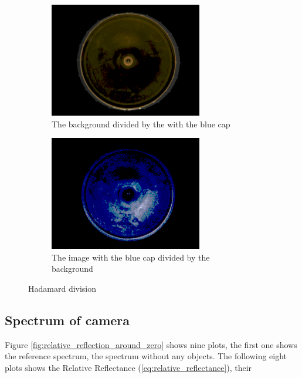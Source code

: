 \documentclass{article}
\begin{document}
\begin{figure}[h]
    \begin{subfigure}{0.5\textwidth}
        \includegraphics[width=0.9\linewidth, height=5cm]{figures/processed_camera_pictures/002_blue_cap_negative_difference.png} 
        \caption{The background divided by the with the blue cap}
        \label{fig:002_blue_cap_negative_difference}
        \end{subfigure}%
        \begin{subfigure}{0.5\textwidth}
        \includegraphics[width=0.9\linewidth, height=5cm]{figures/processed_camera_pictures/002_blue_cap_positive_difference.png}
        \caption{The image with the blue cap divided by the background}
        \label{fig:002_blue_cap_positive_difference}
    \end{subfigure}
    
    \caption{Hadamard division}
    \label{fig:hadamard_division}
\end{figure}


\subsection{Spectrum of camera}
Figure \ref{fig:relative_reflection_around_zero} shows nine plots, the first one shows the reference spectrum, the spectrum without any objects. The following eight plots shows the Relative Reflectance (\ref{eq:relative_reflectance}), their 
\end{document}
